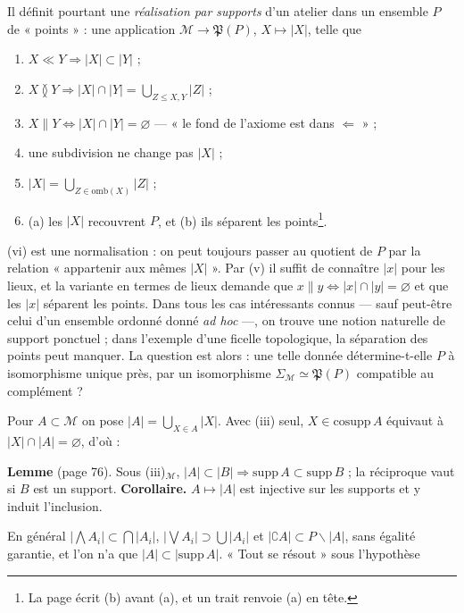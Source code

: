 \documentclass[11pt,a4paper]{article}
\begin{document}
Il définit pourtant une \emph{réalisation par supports} d'un atelier dans un
ensemble $P$ de « points » : une application $\mathcal{M} \to \mathfrak{P}(P)$, $X
\mapsto |X|$, telle que
\begin{enumerate}
\item[(i)$_{\mathcal{M}}$] $X \ll Y \Rightarrow |X| \subset |Y|$ ;
\item[(ii)$_{\mathcal{M}}$] $X \between Y \Rightarrow |X| \cap |Y| = \bigcup_{Z \leq
X, Y} |Z|$ ;
\item[(iii)$_{\mathcal{M}}$] $X \parallel Y \iff |X| \cap |Y| = \varnothing$ --- « le
fond de l'axiome est dans $\Leftarrow$ » ;
\item[(iv)$_{\mathcal{M}}$] une subdivision ne change pas $|X|$ ;
\item[(v)$_{\mathcal{M}}$] $|X| = \bigcup_{Z \in \mathrm{omb}(X)} |Z|$ ;
\item[(vi)$_{\mathcal{M}}$] (a) les $|X|$ recouvrent $P$, et (b) ils séparent les
points\footnote{La page écrit (b) avant (a), et un trait renvoie (a) en tête.}.
\end{enumerate}
(vi) est une normalisation : on peut toujours passer au quotient de $P$ par la
relation « appartenir aux mêmes $|X|$ ». Par (v) il suffit de connaître $|x|$
pour les lieux, et la variante en termes de lieux demande que $x \parallel y \iff
|x| \cap |y| = \varnothing$ et que les $|x|$ séparent les points. Dans tous les
cas intéressants connus --- sauf peut-être celui d'un ensemble ordonné donné
\emph{ad hoc} ---, on trouve une notion naturelle de support ponctuel ; dans
l'exemple d'une ficelle topologique, la séparation des points peut manquer. La
question est alors : une telle donnée détermine-t-elle $P$ à isomorphisme unique
près, par un isomorphisme $\Sigma_{\mathcal{M}} \simeq \mathfrak{P}(P)$ compatible
au complément ?

Pour $A \subset \mathcal{M}$ on pose $|A| = \bigcup_{X \in A} |X|$. Avec (iii) seul,
$X \in \mathrm{cosupp}\, A$ équivaut à $|X| \cap |A| = \varnothing$, d'où :

\textbf{Lemme} (page 76). Sous (iii)$_{\mathcal{M}}$, $|A| \subset |B| \Rightarrow
\mathrm{supp}\, A \subset \mathrm{supp}\, B$ ; la réciproque vaut si $B$ est un
support. \textbf{Corollaire.} $A \mapsto |A|$ est injective sur les supports et y
induit l'inclusion.

En général $|\bigwedge A_{i}| \subset \bigcap |A_{i}|$, $|\bigvee A_{i}| \supset
\bigcup |A_{i}|$ et $|\complement A| \subset P \smallsetminus |A|$, sans égalité
garantie, et l'on n'a que $|A| \subset |\mathrm{supp}\, A|$. « Tout se résout »
sous l'hypothèse
\end{document}
